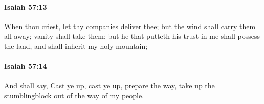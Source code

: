 		\paragraph{Isaiah 57:13} %
			\label{ISAIAH-57-13}

			When thou criest, let thy companies deliver thee; but the wind shall carry them all away; vanity shall take them: but he that putteth his trust in me shall possess the land, and shall inherit my holy mountain;


		\paragraph{Isaiah 57:14} %
			\label{ISAIAH-57-14}

			And shall say, Cast ye up, cast ye up, prepare the way, take up the stumblingblock out of the way of my people.


